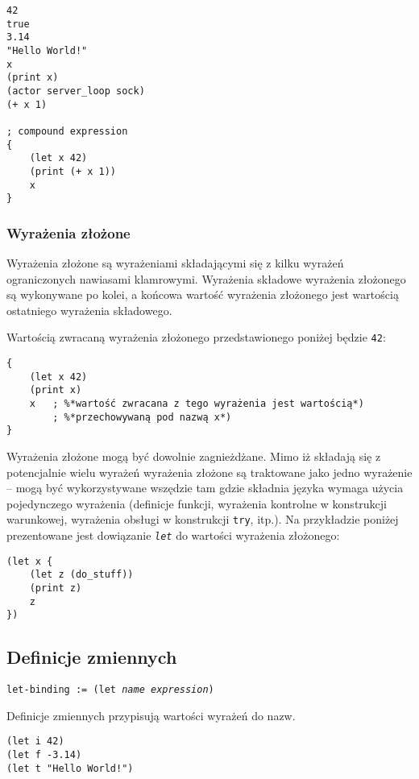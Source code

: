 \begin{lstlisting}
42
true
3.14
"Hello World!"
x
(print x)
(actor server_loop sock)
(+ x 1)

; compound expression
{
    (let x 42)
    (print (+ x 1))
    x
}
\end{lstlisting}

\subsubsection{Wyrażenia złożone}

Wyrażenia złożone są wyrażeniami składającymi się z kilku wyrażeń ograniczonych nawiasami klamrowymi.
Wyrażenia składowe wyrażenia złożonego są wykonywane po kolei, a końcowa wartość wyrażenia złożonego jest
wartością ostatniego wyrażenia składowego.

Wartością zwracaną wyrażenia złożonego przedstawionego poniżej będzie \texttt{42}:

\begin{lstlisting}
{
    (let x 42)
    (print x)
    x   ; %*wartość zwracana z tego wyrażenia jest wartością*)
        ; %*przechowywaną pod nazwą x*)
}
\end{lstlisting}

Wyrażenia złożone mogą być dowolnie zagnieżdżane. Mimo iż składają się z potencjalnie wielu wyrażeń
wyrażenia złożone są traktowane jako jedno wyrażenie -- mogą być wykorzystywane wszędzie tam gdzie składnia
języka wymaga użycia pojedynczego wyrażenia (definicje funkcji, wyrażenia kontrolne w konstrukcji warunkowej,
wyrażenia obsługi w konstrukcji \texttt{try}, itp.). Na przykładzie poniżej prezentowane jest dowiązanie
\emph{\texttt{let}} do wartości wyrażenia złożonego:

\begin{lstlisting}
(let x {
    (let z (do_stuff))
    (print z)
    z
})
\end{lstlisting}

\subsection{Definicje zmiennych}

\texttt{let-binding := (let \emph{name} \emph{expression})}
\vspace{1em}

Definicje zmiennych przypisują wartości wyrażeń do nazw.

\begin{lstlisting}
(let i 42)
(let f -3.14)
(let t "Hello World!")
\end{lstlisting}

